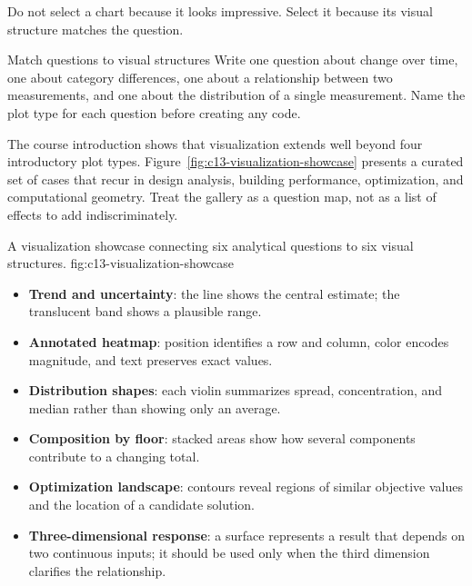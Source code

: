 Do not select a chart because it looks impressive. Select it because its visual
structure matches the question.

\begin{TryBox}{Match questions to visual structures}
Write one question about change over time, one about category differences, one
about a relationship between two measurements, and one about the distribution
of a single measurement. Name the plot type for each question before creating
any code.
\end{TryBox}

\label{sec:c13-showcase}

The course introduction shows that visualization extends well beyond four
introductory plot types. Figure~\ref{fig:c13-visualization-showcase} presents a
curated set of cases that recur in design analysis, building performance,
optimization, and computational geometry. Treat the gallery as a question
map, not as a list of effects to add indiscriminately.

{A visualization showcase connecting six analytical questions to six visual structures.}
{fig:c13-visualization-showcase}

\begin{itemize}
    \item \textbf{Trend and uncertainty}: the line shows the central estimate;
          the translucent band shows a plausible range.
    \item \textbf{Annotated heatmap}: position identifies a row and column,
          color encodes magnitude, and text preserves exact values.
    \item \textbf{Distribution shapes}: each violin summarizes spread,
          concentration, and median rather than showing only an average.
    \item \textbf{Composition by floor}: stacked areas show how several
          components contribute to a changing total.
    \item \textbf{Optimization landscape}: contours reveal regions of similar
          objective values and the location of a candidate solution.
    \item \textbf{Three-dimensional response}: a surface represents a result
          that depends on two continuous inputs; it should be used only when
          the third dimension clarifies the relationship.
\end{itemize}

